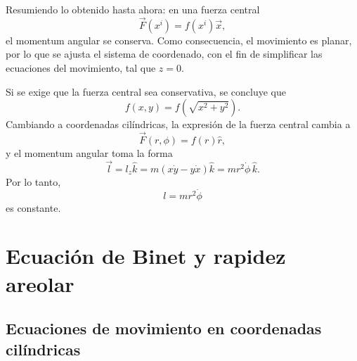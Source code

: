 \documentclass[../apunte_mecanica_clasica.tex]{subfiles}%
\begin{document}
Resumiendo lo obtenido hasta ahora: en una fuerza central
\begin{equation}
    \vec F(x^i)=f(x^i)\vec x,
    \label{eq:fcbk-fuerza-central-resumen-1}
\end{equation}
el momentum angular se conserva. Como consecuencia, el movimiento es planar, por lo que se ajusta el sistema de coordenado, con el fin de simplificar las ecuaciones del movimiento, tal que $z=0$.

Si se exige que la fuerza central sea conservativa, se concluye que
\begin{equation}
    f(x,y)=f\left(\sqrt{x^2+y^2}\right).
    \label{eq:fcbk-f-radial-cartesiano}
\end{equation}
Cambiando a coordenadas cilíndricas, la expresión de la fuerza central cambia a
\begin{equation}
    \vec F(r,\phi)=f(r)\hat r,
    \label{eq:fcbk-fuerza-central-resumen-2}
\end{equation}
y el momentum angular toma la forma
\begin{equation}
    \vec l=l_z\hat{k}=m(x\dot y-y\dot x)\hat{k}=mr^2\dot\phi\,\hat{k}.
    \label{eq:fcbk-l-mr2phidot-vector}
\end{equation}
Por lo tanto,
\begin{equation}
    l=mr^2\dot\phi
    \label{eq:fcbk-l-mr2phidot}
\end{equation}
es constante.

\newpage
\section{Ecuación de Binet y rapidez areolar}

\subsection{Ecuaciones de movimiento en coordenadas cilíndricas}
\end{document}
